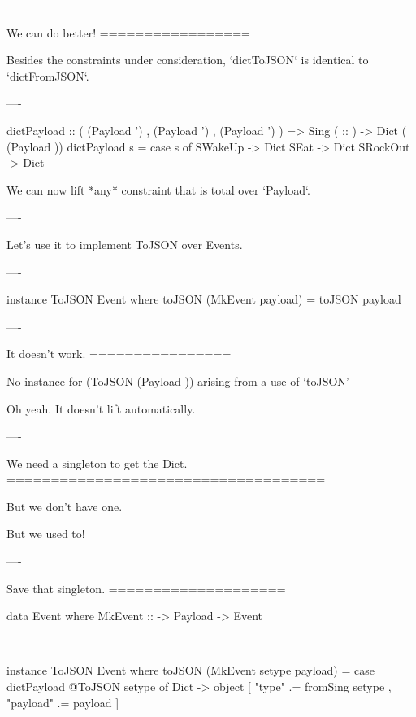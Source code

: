 ----

We can do better!
=================

Besides the constraints under consideration, `dictToJSON` is identical to `dictFromJSON`.

----

\begin{raw}

  dictPayload :: (  (Payload ')
                 ,  (Payload ')
                 ,  (Payload ')
                 )
              => Sing ( :: )
              -> Dict ( (Payload ))
  dictPayload s = case s of
    SWakeUp  -> Dict
    SEat     -> Dict
    SRockOut -> Dict
\end{raw}

We can now lift *any* constraint that is total over `Payload`.

----

Let's use it to implement ToJSON over Events.

----

\begin{hs}
  instance ToJSON Event where
    toJSON (MkEvent payload) = toJSON payload
\end{hs}

----

It doesn't work.
================

\begin{error}
  No instance for (ToJSON (Payload ))
    arising from a use of `toJSON'
\end{error}

Oh yeah. It doesn't lift automatically.

----

We need a singleton to get the Dict.
====================================

But we don't have one.

But we used to!

----

Save that singleton.
====================

\begin{raw}
  data Event where
    MkEvent :: 
            -> Payload 
            -> Event
\end{raw}

----

\begin{hs}
  instance ToJSON Event where
    toJSON (MkEvent setype payload) =
      case dictPayload @ToJSON setype of
        Dict ->
          object [ "type"    .= fromSing setype
                 , "payload" .= payload
                 ]
\end{hs}

